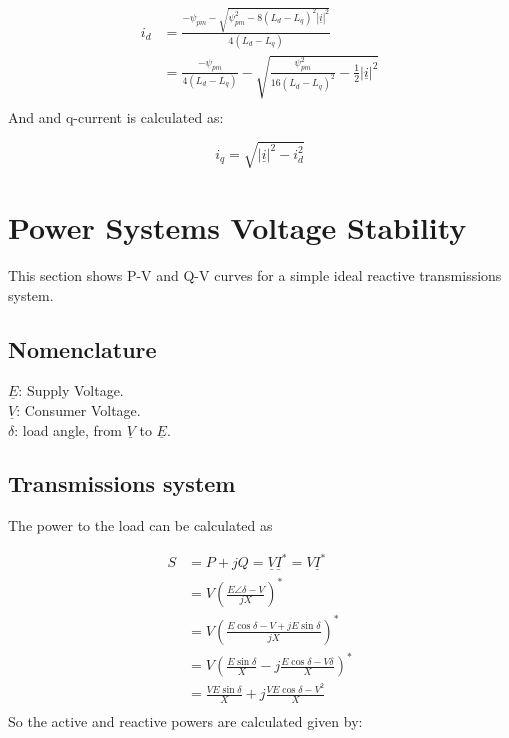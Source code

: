 \documentclass[]{book}
\begin{document}
\[
\begin{aligned}
i_d &= \frac{-\psi_{pm} - \sqrt{\psi_{pm}^2 - 8 (L_d-L_q)^2 |\underline{i}|^2}}{4 (L_d-L_q)} \\
&= \frac{-\psi_{pm} }{4 (L_d-L_q)} -   \sqrt{\frac{\psi_{pm}^2}{16 (L_d-L_q)^2} - \frac{1}{2} |\underline{i}|^2}\\
\end{aligned}
\label{eq:mtpa5}
\]
And and q-current is calculated as:

\[
i_q = \sqrt{|\underline{i}|^2 - i^2_d }
\label{eq:mtpa6}
\]

\hypertarget{power-systems-voltage-stability}{%
\chapter{Power Systems Voltage Stability}\label{power-systems-voltage-stability}}

This section shows P-V and Q-V curves for a simple ideal reactive transmissions system.

\hypertarget{nomenclature-3}{%
\section{Nomenclature}\label{nomenclature-3}}

\(\underline{E}\): Supply Voltage.\\
\(\underline{V}\): Consumer Voltage.\\
\(\delta\): load angle, from \(\underline{V}\) to \(\underline{E}\).

\hypertarget{transmissions-system}{%
\section{Transmissions system}\label{transmissions-system}}

The power to the load can be calculated as

\[
\begin{aligned}
S &= P +j Q = \underline{V} \underline{I}^* = V \underline{I}^* \\
&= V \left( \frac{E \angle\delta-V}{jX} \right)^*  \\
&= V \left( \frac{ E \cos \delta - V + jE \sin  \delta }{jX} \right)^*  \\
&= V \left( \frac{  E \sin  \delta }{X} -j \frac{ E \cos \delta - V  \delta }{X} \right)^*  \\
&=  \frac{  VE \sin  \delta }{X} +j \frac{ VE \cos \delta - V^2  }{X}   \\
\end{aligned}
\label{eq:PV1}
\]
So the active and reactive powers are calculated given by:
\end{document}

